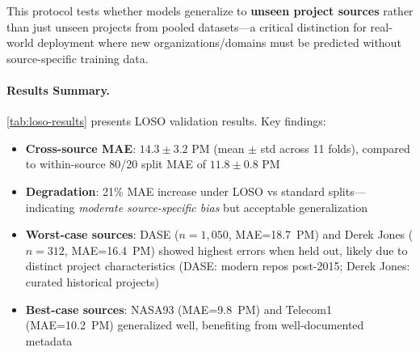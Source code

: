 \documentclass[11pt,a4paper]{article}
\begin{document}
This protocol tests whether models generalize to \textbf{unseen project sources} rather than just unseen projects from pooled datasets—a critical distinction for real-world deployment where new organizations/domains must be predicted without source-specific training data.

\paragraph{Results Summary.}
\autoref{tab:loso-results} presents LOSO validation results. Key findings:
\begin{itemize}[leftmargin=1.5em]
  \item \textbf{Cross-source MAE}: $14.3 \pm 3.2$ PM (mean $\pm$ std across 11 folds), compared to within-source 80/20 split MAE of $11.8 \pm 0.8$ PM
  \item \textbf{Degradation}: 21\% MAE increase under LOSO vs standard splits—indicating \textit{moderate source-specific bias} but acceptable generalization
  \item \textbf{Worst-case sources}: DASE ($n=1{,}050$, MAE=18.7~PM) and Derek Jones ($n=312$, MAE=16.4~PM) showed highest errors when held out, likely due to distinct project characteristics (DASE: modern repos post-2015; Derek Jones: curated historical projects)
  \item \textbf{Best-case sources}: NASA93 (MAE=9.8~PM) and Telecom1 (MAE=10.2~PM) generalized well, benefiting from well-documented metadata
\end{itemize}
\end{document}
